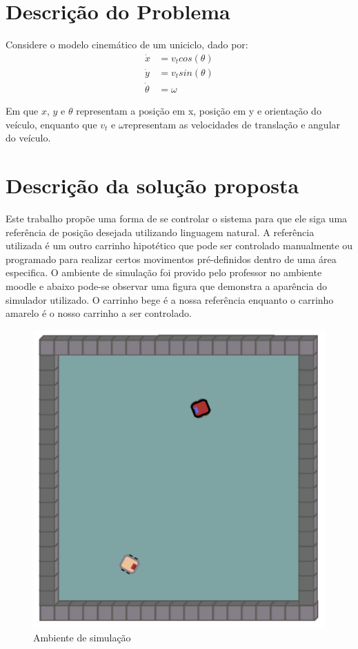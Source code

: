 \graphicspath{ {./imagens/} }

\section{Descrição do Problema}
Considere o modelo cinemático de um uniciclo, dado por:
    \begin{align*}
            \dot{x} &= v_t cos(\theta)\\
            \dot{y} &= v_t sin(\theta)\\
            \dot{\theta} &= \omega
    \end{align*}

Em que $x$, $y$ e $\theta$ representam a posição em x, posição em y e orientação do veículo, enquanto
que $v_t$ e $\omega$representam as velocidades de translação e angular do veículo.

\section{Descrição da solução proposta}

Este trabalho propõe uma forma de se controlar o sistema para que ele siga uma referência de posição desejada utilizando linguagem natural. A referência utilizada é um outro carrinho hipotético que pode ser controlado manualmente ou programado para realizar certos movimentos pré-definidos dentro de uma área especifica. O ambiente de simulação foi provido pelo professor no ambiente moodle e abaixo pode-se observar uma figura que demonstra a aparência do simulador utilizado. O carrinho bege é a nossa referência enquanto o carrinho amarelo é o nosso carrinho a ser controlado.

\begin{figure}[H] 
    \centering
    \includegraphics[scale=0.5]{carrinho_base.png}
    \caption{Ambiente de simulação}
\end{figure}

